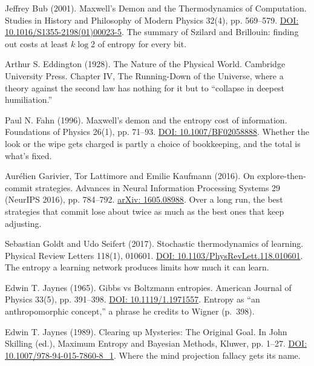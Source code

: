 \documentclass[11pt,twoside]{article}
\theoremstyle{thielethm}
\theoremstyle{thieledef}
\theoremstyle{thieledef}
\theoremstyle{thieledef}
\theoremstyle{thielethm}
\theoremstyle{thieleobs}
\theoremstyle{thielethm}
\begin{document}
\noindent Jeffrey Bub (2001). Maxwell's Demon and the Thermodynamics of Computation. Studies in History and Philosophy of Modern Physics 32(4), pp. 569--579. \href{https://doi.org/10.1016/S1355-2198(01)00023-5}{DOI: 10.1016/S1355-2198(01)00023-5}. The summary of Szilard and Brillouin: finding out costs at least $k \log 2$ of entropy for every bit.
\par\medskip

\noindent Arthur S. Eddington (1928). The Nature of the Physical World. Cambridge University Press. Chapter IV, The Running-Down of the Universe, where a theory against the second law has nothing for it but to ``collapse in deepest humiliation.''
\par\medskip

\noindent Paul N. Fahn (1996). Maxwell's demon and the entropy cost of information. Foundations of Physics 26(1), pp. 71--93. \href{https://doi.org/10.1007/BF02058888}{DOI: 10.1007/BF02058888}. Whether the look or the wipe gets charged is partly a choice of bookkeeping, and the total is what's fixed.
\par\medskip

\noindent Aur\'elien Garivier, Tor Lattimore and Emilie Kaufmann (2016). On explore-then-commit strategies. Advances in Neural Information Processing Systems 29 (NeurIPS 2016), pp. 784--792. \href{https://arxiv.org/abs/1605.08988}{arXiv: 1605.08988}. Over a long run, the best strategies that commit lose about twice as much as the best ones that keep adjusting.
\par\medskip

\noindent Sebastian Goldt and Udo Seifert (2017). Stochastic thermodynamics of learning. Physical Review Letters 118(1), 010601. \href{https://doi.org/10.1103/PhysRevLett.118.010601}{DOI: 10.1103/PhysRevLett.118.010601}. The entropy a learning network produces limits how much it can learn.
\par\medskip

\noindent Edwin T. Jaynes (1965). Gibbs vs Boltzmann entropies. American Journal of Physics 33(5), pp. 391--398. \href{https://doi.org/10.1119/1.1971557}{DOI: 10.1119/1.1971557}. Entropy as ``an anthropomorphic concept,'' a phrase he credits to Wigner (p.~398).
\par\medskip

\noindent Edwin T. Jaynes (1989). Clearing up Mysteries: The Original Goal. In John Skilling (ed.), Maximum Entropy and Bayesian Methods, Kluwer, pp. 1--27. \href{https://doi.org/10.1007/978-94-015-7860-8_1}{DOI: 10.1007/978-94-015-7860-8\_1}. Where the mind projection fallacy gets its name.
\par\medskip
\end{document}
